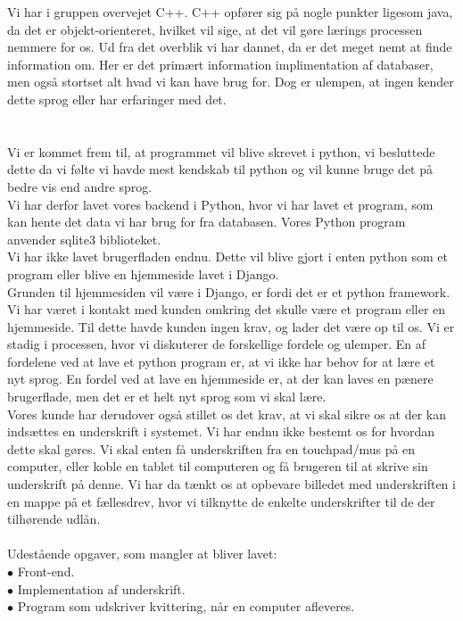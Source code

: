 \documentclass[a4paper]{article}
\begin{document}
Vi har i gruppen overvejet C++. C++ opfører sig på nogle punkter ligesom java, da det er objekt-orienteret, hvilket vil sige, at det vil gøre lærings processen nemmere for os. Ud fra det overblik vi har dannet, da er det meget nemt at finde information om. Her er det primært information implimentation af databaser, men også stortset alt hvad vi kan have brug for. Dog er ulempen, at ingen kender dette sprog eller har erfaringer med det.\\ \\ \\
Vi er kommet frem til, at programmet vil blive skrevet i python, vi besluttede dette da vi følte vi havde mest kendskab til python og vil kunne bruge det på bedre vis end andre sprog. \\
Vi har derfor lavet vores backend i Python, hvor vi har lavet et program, som kan hente det data vi har brug for fra databasen. Vores Python program anvender sqlite3 biblioteket. \\
Vi har ikke lavet brugerfladen endnu. Dette vil blive gjort i enten python som et program eller blive en hjemmeside lavet i Django.\\ Grunden til hjemmesiden vil være i Django, er fordi det er et python framework. Vi har været i kontakt med kunden omkring det skulle være et program eller en hjemmeside. Til dette havde kunden ingen krav, og lader det være op til os. Vi er stadig i processen, hvor vi diskuterer de forskellige fordele og ulemper. En af fordelene ved at lave et python program er, at vi ikke har behov for at lære et nyt sprog. En fordel ved at lave en hjemmeside er, at der kan laves en pænere brugerflade, men det er et helt nyt sprog som vi skal lære. \\
Vores kunde har derudover også stillet os det krav, at vi skal sikre os at der kan indsættes en underskrift i systemet. Vi har endnu ikke bestemt os for hvordan dette skal gøres. Vi skal enten få underskriften fra en touchpad/mus på en computer, eller koble en tablet til computeren og få brugeren til at skrive sin underskrift på denne. Vi har da tænkt os at opbevare billedet med underskriften i en mappe på et fællesdrev, hvor vi tilknytte de enkelte underskrifter til de der tilhørende udlån. \\ \\
Udestående opgaver, som mangler at bliver lavet: \\
$\bullet$ Front-end. \\
$\bullet$ Implementation af underskrift. \\
$\bullet$ Program som udskriver kvittering, når en computer afleveres.
\end{document}
